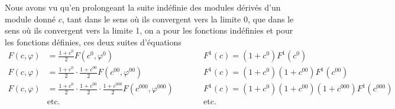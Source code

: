 \documentclass{article}
\begin{document}
Nous avons vu qu'en prolongeant la suite indéfinie des modules dérivés d'un module donné $c$, tant dans le sens où ils convergent vers la limite 0, que dans le sens où ils convergent vers la limite 1, on a pour les fonctions indéfinies et pour les fonctions définies, ces deux suites d'équations
\[ \begin{aligned} F(c,\varphi)&=\frac{1+c^{0}}{2}F(c^{0},\varphi^{0}) &\qquad& F^{1}(c)=(1+c^{0})F^{1}(c^{0})\\ F(c,\varphi)&=\frac{1+c^{0}}{2}\cdot\frac{1+c^{00}}{2}F(c^{00},\varphi^{00}) && F^{1}(c)=(1+c^{0})(1+c^{00})F^{1}(c^{00})\\ F(c,\varphi)&=\frac{1+c^{0}}{2}\cdot\frac{1+c^{00}}{2}\cdot\frac{1+c^{000}}{2}F(c^{000},\varphi^{000}) && F^{1}(c)=(1+c^{0})(1+c^{00})(1+c^{000})F^{1}(c^{000})\\ &\text{etc.} && \text{etc.} \end{aligned} \]
\end{document}
